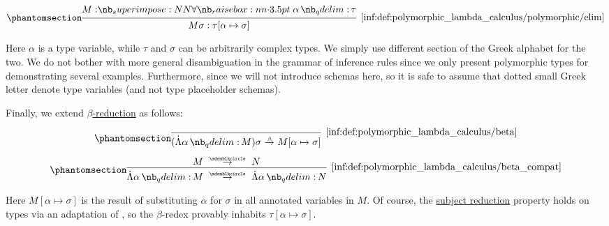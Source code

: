 \begin{definition}
\begin{paracol}{2}
    \begin{rightcolumn}
      \ParacolAlignmentHack
      \begin{equation*}\taglabel[\ensuremath{ \forall_- }]{inf:def:polymorphic_lambda_calculus/polymorphic/elim}
        \begin{prooftree}
          \hypo{ M: \qforall \alpha \tau }
          \infer1[\ref{inf:def:polymorphic_lambda_calculus/polymorphic/elim}]{ M\sigma: \tau[\alpha \mapsto \sigma] }.
        \end{prooftree}
      \end{equation*}
    \end{rightcolumn}
  \end{paracol}

  Here \( \alpha \) is a type variable, while \( \tau \) and \( \sigma \) can be arbitrarily complex types. We simply use different section of the Greek alphabet for the two. We do not bother with more general disambiguation in the grammar of inference rules since we only present polymorphic types for demonstrating several examples. Furthermore, since we will not introduce schemas here, so it is safe to assume that dotted small Greek letter denote type variables (and not type placeholder schemas).

  Finally, we extend \hyperref[def:typed_term_reduction]{\( \beta \)-reduction} as follows:
  \begin{paracol}{2}
    \begin{leftcolumn}
      \ParacolAlignmentHack
      \begin{equation*}\taglabel[\ensuremath{ \logic{Red}_\Lambda^\beta }]{inf:def:polymorphic_lambda_calculus/beta}
        \begin{prooftree}
          \infer0[\ref{inf:def:polymorphic_lambda_calculus/beta}]{ (\qAbs \alpha M) \sigma \bred M[\alpha \mapsto \sigma] }.
        \end{prooftree}
      \end{equation*}
    \end{leftcolumn}

    \begin{rightcolumn}
      \ParacolAlignmentHack
      \begin{equation*}\taglabel[\ensuremath{ \logic{Red}_\Lambda }]{inf:def:polymorphic_lambda_calculus/beta_compat}
        \begin{prooftree}
          \hypo{ M \pred N }
          \infer1[\ref{inf:def:polymorphic_lambda_calculus/beta_compat}]{ \qAbs \alpha M \pred \qAbs \alpha N }
        \end{prooftree}
      \end{equation*}
    \end{rightcolumn}
  \end{paracol}

  Here \( M[\alpha \mapsto \sigma] \) is the result of substituting \( \alpha \) for \( \sigma \) in all annotated variables in \( M \). Of course, the \hyperref[con:subject_reduction]{subject reduction} property holds on types via an adaptation of , so the \( \beta \)-redex provably inhabits \( \tau[\alpha \mapsto \sigma] \).
\end{definition}
